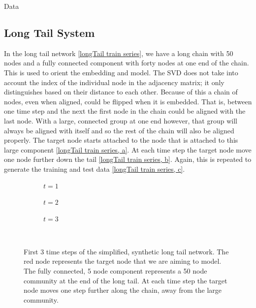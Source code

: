 \documentclass[12pt]{amsart}
\begin{document}
\begin{section}{Data}
    \subsection{Long Tail System}
        \label{longtaildata}
        In the long tail network \autoref{longTail train series}, we have a long chain with 50 nodes and a fully connected component with forty nodes at one end of the chain. This is used to orient the embedding and model. The SVD does not take into account the index of the individual node in the adjacency matrix; it only distinguishes based on their distance to each other. Because of this a chain of nodes, even when aligned, could be flipped when it is embedded. That is, between one time step and the next the first node in the chain could be aligned with the last node. With a large, connected group at one end however, that group will always be aligned with itself and so the rest of the chain will also be aligned properly. The target node starts attached to the node that is attached to this large component \autoref{longTail train series, a}. At each time step the target node move one node further down the tail \autoref{longTail train series, b}. Again, this is repeated to generate the training and test data \autoref{longTail train series, c}.
        \begin{figure}[H]
            \centering
            \begin{subfigure}[c]{0.3\textwidth}
                \centering
                \resizebox{.6\width}{!}{}
                \caption{$t=1$}
                \label{longTail train series, a}
            \end{subfigure}
            \hfill
            \centering
            \begin{subfigure}[c]{0.3\textwidth}
                \centering
                \resizebox{.6\width}{!}{}
                \caption{$t=2$}
                \label{longTail train series, b}
            \end{subfigure}
            \hfill
            \centering
            \begin{subfigure}[c]{0.3\textwidth}
                \centering
                \resizebox{.6\width}{!}{}
                \caption{$t=3$}
                \label{longTail train series, c}
            \end{subfigure}\\
            \caption{First 3 time steps of the simplified, synthetic long tail network. The red node represents the target node that we are aiming to model. The fully connected, 5 node component represents a 50 node community at the end of the long tail. At each time step the target node moves one step further along the chain, away from the large community.}
            \label{longTail train series}
        \end{figure}    


\end{section}
\end{document}

